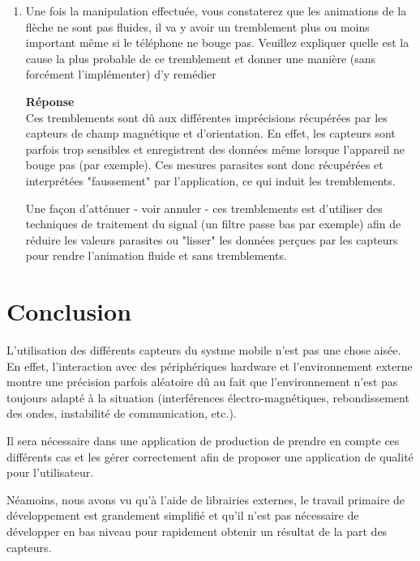 \documentclass[a4paper]{article}
\begin{document}
\begin{enumerate}
    \item Une fois la manipulation effectuée, vous constaterez que les animations de la flèche ne sont pas
    fluides, il va y avoir un tremblement plus ou moins important même si le téléphone ne bouge pas.
    Veuillez expliquer quelle est la cause la plus probable de ce tremblement et donner une manière (sans
    forcément l’implémenter) d’y remédier
    
    \textbf{Réponse} \\
    Ces tremblements sont dû aux différentes imprécisions récupérées par les capteurs de champ magnétique et d'orientation. En effet, les capteurs sont parfois trop sensibles et enregistrent des données même lorsque l'appareil ne bouge pas (par exemple). Ces mesures parasites sont donc récupérées et interprétées "faussement" par l'application, ce qui induit les tremblements.
    
    Une façon d'atténuer - voir annuler - ces tremblements est d'utiliser des techniques de traitement du signal (un filtre passe bas par exemple) afin de réduire les valeurs parasites ou "lisser" les données perçues par les capteurs pour rendre l'animation fluide et sans tremblements.
    
\end{enumerate}

\section{Conclusion}

L'utilisation des différents capteurs du systme mobile n'est pas une chose aisée. En effet, l'interaction avec des périphériques hardware et l'environnement externe montre une précision parfois aléatoire dû au fait que l'environnement n'est pas toujours adapté à la situation (interférences électro-magnétiques, rebondissement des ondes, instabilité de communication, etc.).

Il sera nécessaire dans une application de production de prendre en compte ces différents cas et les gérer correctement afin de proposer une application de qualité pour l'utilisateur.

Néamoins, nous avons vu qu'à l'aide de librairies externes, le travail primaire de développement est grandement simplifié et qu'il n'est pas nécessaire de développer en bas niveau pour rapidement obtenir un résultat de la part des capteurs.
\end{document}
